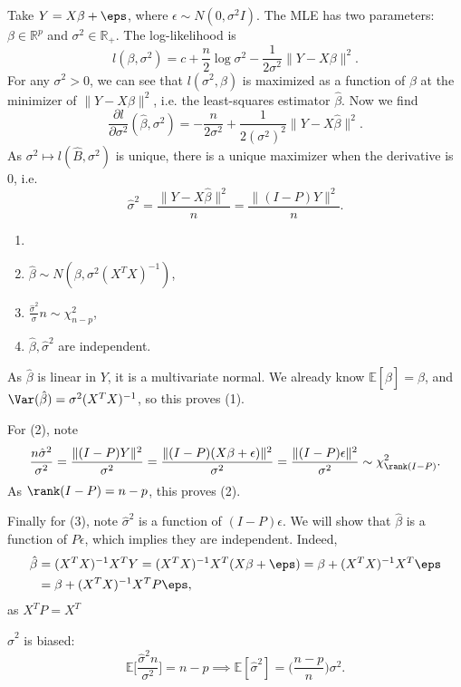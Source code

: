 \documentclass[12pt]{article}
\begin{document}
Take $Y = X \beta + \eps$, where $\epsilon \sim N(0, \sigma^2 I)$. The MLE has two parameters: $\beta \in \mathbb{R}^{p}$ and $\sigma^2 \in \mathbb{R}_{+}$. The log-likelihood is
\[
l(\beta, \sigma^2) = c + \frac{n}{2} \log \sigma^2 - \frac{1}{2 \sigma^2} \|Y - X \beta\|^2.
\]
For any $\sigma^2 > 0$, we can see that $l(\sigma^2, \beta)$ is maximized as a function of $\beta$ at the minimizer of $\|Y - X \beta\|^2$, i.e. the least-squares estimator $\hat \beta$. Now we find
\[
\frac{\partial l}{\partial \sigma^2}(\hat \beta, \sigma^2) = - \frac{n}{2 \sigma^2} + \frac{1}{2(\sigma^2)^2} \|Y - X \hat \beta\|^2.
\]
As $\sigma^2 \mapsto l(\hat B, \sigma^2)$ is unique, there is a unique maximizer when the derivative is $0$, i.e.
\[
\hat \sigma^2 = \frac{\|Y - X \hat \beta\|^2}{n} = \frac{\|(I-P)Y\|^2}{n}.
\]
\begin{theorem}
	\begin{enumerate}[\normalfont1.]
		\item[]
	\item $\hat \beta \sim N(\beta, \sigma^2(X^{T}X)^{-1})$,
	\item $\frac{\hat \sigma^2}{\sigma} n \sim \chi^2_{n-p}$,
	\item $\hat \beta, \hat \sigma^2$ are independent.
\end{enumerate}
\end{theorem}

\begin{proofbox}
	As $\hat \beta$ is linear in $Y$, it is a multivariate normal. We already know $\mathbb{E}[\hat \beta] = \beta$, and $\Var(\hat \beta) = \sigma^2(X^{T}X)^{-1}$, so this proves (1).

	For (2), note
	\[
	\frac{n \hat \sigma^2}{\sigma^2} = \frac{\|(I-P)Y\|^2}{\sigma^2}= \frac{\|(I-P)(X\beta+\epsilon)\|^2}{\sigma^2} = \frac{\|(I-P)\epsilon\|^2}{\sigma^2} \sim \chi^2_{\rank(I-P)}.
	\]
	As $\rank(I-P) = n - p$, this proves (2).

	Finally for (3), note $\hat \sigma^2$ is a function of $(I-P)\epsilon$. We will show that $\hat \beta$ is a function of $P \epsilon$, which implies they are independent. Indeed,
	\begin{align*}
		\hat \beta &= (X^{T}X)^{-1}X^{T}Y = (X^{T}X)^{-1}X^{T}(X\beta + \eps) = \beta + (X^{T}X)^{-1}X^{T}\eps \\
			   &= \beta + (X^{T}X)^{-1}X^{T}P\eps,
	\end{align*}
	as $X^{T}P = X^{T}$
\end{proofbox}

\begin{corollary}
	$\hat \sigma^2$ is biased:
	\[
	\mathbb{E}\biggl[ \frac{\hat \sigma^2 n}{\sigma^2} \biggr] = n-p \implies \mathbb{E}[\hat \sigma^2] = \biggl( \frac{n - p}{n} \biggr) \sigma^2.
	\]
\end{corollary}
\end{document}
